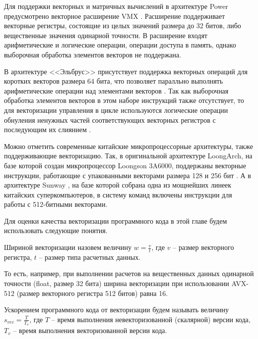 Для поддержки векторных и матричных вычислений в архитектуре Power предусмотрено векторное расширение VMX\label{abbr:vmx-1} \cite{Gschwind2016VecPower,Eisen2007VecPower}.
Расширение поддерживает векторные регистры, состоящие из целых значений размера до 32 битов, либо вещественные значения одинарной точности.
В расширение входят арифметические и логические операции, операции доступа в память, однако выборочная обработка элементов векторов не поддержана.

В архитектуре <<Эльбрус>> присутствует поддержка векторных операций для коротких векторов размера 64 бита, что позволяет паралльно выполнять арифметические операции над элементами векторов \cite{Ishin2011VecElbrus}.
Так как выборочная обработка элементов векторов в этом наборе инструкций также отсутствует, то для векторизации управления в цикле используются логические операции обнуления ненужных частей соответствующих векторных регистров с последующим их слиянием \cite{Volkonsky2012VecElbrus}.

Можно отметить современные китайские микропроцессорные архитектуры, также поддерживающие векторизацию.
Так, в оригинальной архитектуре LoongArch, на базе которой создан микропроцессор Loongson 3A6000, поддержаны векторные инструкции, работающие с упакованными векторами размера 128 и 256 бит \cite{Bai2024VecLoongarch}.
А в архитектуре Sunway \cite{Sun2023VecSunway}, на базе которой собрана одна из мощнейших линеек китайских суперкомпьютеров, в систему команд включены инструкции для работы с 512-битными векторами.

Для оценки качества векторизации программного кода в этой главе будем использовать следующие понятия.

\begin{definition}
Шириной векторизации назовем величину $w = \frac{v}{t}$, где $v$ -- размер векторного регистра, $t$ -- размер типа расчетных данных.
\end{definition}

То есть, например, при выполнении расчетов на вещественных данных одинарной точности (float, размер 32 бита) ширина векторизации при использовании AVX-512\label{abbr:avx-3} (размер векторного регистра 512 битов) равна 16.

\begin{definition}
Ускорением программного кода от векторизации будем называть величину $s_{vec} = \frac{T}{T_v}$, где $T$ -- время выполнения невекторизованной (скалярной) версии кода, $T_v$ -- время выполнения векторизованной версии кода.
\end{definition}

